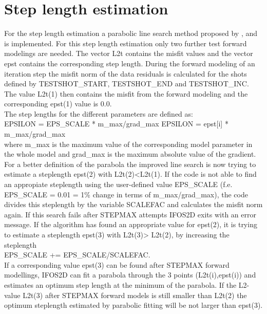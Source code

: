 \section{Step length estimation}
{\color{blue}{\begin{verbatim}
"Step length estimation" : "comment", 
			"EPS_SCALE" : "0.01", 
			"STEPMAX" : "4",
			"SCALEFAC" : "4.0",
			"TESTSHOT_START , TESTSHOT_END , TESTSHOT_INCR" : "1 , 2 , 1",
\end{verbatim}}}

For the step length estimation a parabolic line search method proposed by \cite{sourbier:09,sourbier:09b}, \cite{brossier:2009} and \cite{nocedal:1999} is implemented. For this step length estimation only two further test forward modelings are needed. The vector L2t contains the misfit values and the vector epst contains the corresponding step length. During the forward modeling of an iteration step the misfit norm of the data residuals is calculated for the shots defined by  TESTSHOT\_START, TESTSHOT\_END and TESTSHOT\_INC. The value L2t(1) then contains the misfit from the forward modeling and the corresponding epst(1) value is 0.0.\\

The step lengths for the different parameters are defined as:\\
EPSILON = EPS\_SCALE * m\_max/grad\_max
EPSILON = epst[i] * m\_max/grad\_max\\
where m\_max is the maximum value of the corresponding model parameter in the whole model and grad\_max is the maximum absolute value of the gradient.\\

For a better definition of the parabola the improved line search is now trying to estimate a steplength epst(2) with L2t(2)<L2t(1). If the code is not able to find an appropiate steplength using the user-defined value EPS\_SCALE (f.e. EPS\_SCALE = 0.01 = 1\% change in terms of m\_max/grad\_max), the code divides this steplength by the variable SCALEFAC and calculates the misfit norm again. If this search fails after STEPMAX attempts IFOS2D exits with an error message. If the algorithm has found an appropriate value for epst(2), it is trying to estimate a steplength epst(3) with L2t(3)> L2t(2), by increasing the steplength\\

EPS\_SCALE += EPS\_SCALE/SCALEFAC.\\

If a corresponding value epst(3) can be found after STEPMAX forward modellings, IFOS2D can fit a parabola through the 3 points (L2t(i),epst(i)) and estimates an optimum step length at the minimum of the parabola. If the L2-value L2t(3) after STEPMAX forward models is still smaller than L2t(2) the optimum steplength estimated by parabolic fitting will be not larger than epst(3).\\

